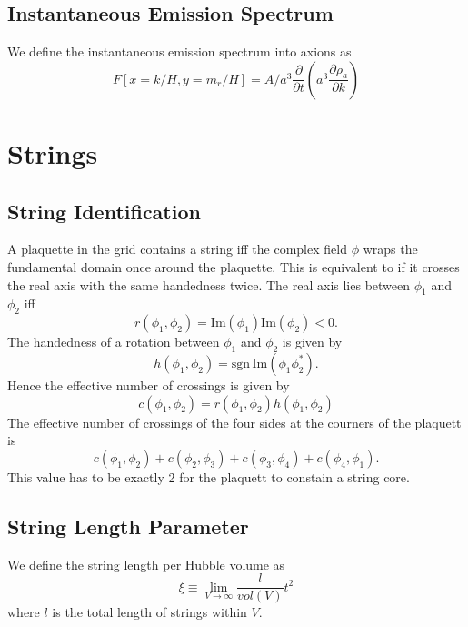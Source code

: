 \documentclass[a4paper]{article}
\begin{document}
\subsection{Instantaneous Emission Spectrum}
We define the instantaneous emission spectrum into axions as
\begin{equation}
    F[x = k / H, y = m_r / H] = A / a^3 \frac{\partial}{\partial t} \left( a^3 \frac{\partial \rho_a}{\partial k} \right)
\end{equation}

\newpage
\section{Strings}

\subsection{String Identification}
A plaquette in the grid contains a string iff the complex field $\phi$ wraps the fundamental domain once around the plaquette.
This is equivalent to if it crosses the real axis with the same handedness twice.
The real axis lies between $\phi_1$ and $\phi_2$ iff
\begin{equation}
	r(\phi_1, \phi_2) = \mathrm{Im}(\phi_1) \mathrm{Im}(\phi_2) < 0.
\end{equation} 
The handedness of a rotation between $\phi_1$ and $\phi_2$ is given by
\begin{equation}
	h(\phi_1, \phi_2) = \mathrm{sgn} \, \mathrm{Im} (\phi_1 \phi_2^*).
\end{equation}
Hence the effective number of crossings is given by
\begin{equation}
	c(\phi_1, \phi_2) = r(\phi_1, \phi_2) h(\phi_1, \phi_2)
\end{equation}
The effective number of crossings of the four sides at the courners of the plaquett is
\begin{equation}
	c(\phi_1, \phi_2) + c(\phi_2, \phi_3) + c(\phi_3, \phi_4) + c(\phi_4, \phi_1).
\end{equation}
This value has to be exactly 2 for the plaquett to constain a string core.

\subsection{String Length Parameter}
We define the string length per Hubble volume as
\begin{equation}
    \xi \equiv \lim_{V \to \infty} \frac{l}{vol(V)} t^2
\end{equation}
where $l$ is the total length of strings within $V$.
\end{document}
